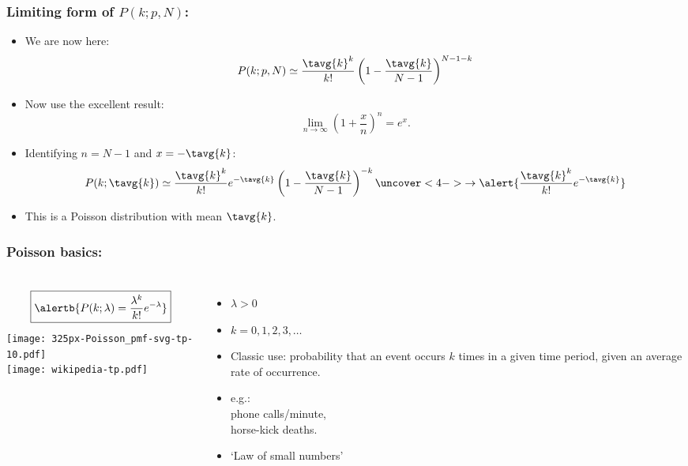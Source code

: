 \begin{frame}[label=]
  \frametitle{Limiting form of $P(k;p,N)$:}
  \small

  \begin{itemize}
  \item<1->
    We are now here:
    $$
    P(k;p,N)
    \simeq
    \frac{\tavg{k}^k}
    {k!}
    \left(
      1-\frac{\tavg{k}}{N-1}
    \right)^{N-1-k}
    $$
  \item<2->
    Now use the excellent result:
    $$
    \lim_{n \rightarrow \infty}
    \left(
      1+\frac{x}{n}
    \right)^n
    = e^{x}.
    $$
  \item<3->
    Identifying $n=N-1$ and $x=-\tavg{k}$:
    $$
    P(k;\tavg{k})
    \simeq
    \frac{\tavg{k}^k}
    {k!}
    e^{-\tavg{k}}
    \left(
      1-\frac{\tavg{k}}{N-1}
    \right)^{-k}
    \uncover<4->{
      \rightarrow
      \alert{
        \frac{\tavg{k}^k}
        {k!}
        e^{-\tavg{k}}
      }
    }
    $$
  \item<4->
    This is a 
    {Poisson distribution}
    with mean $\tavg{k}$.
  \end{itemize}

\end{frame}

\begin{frame}[label=]
  \frametitle{Poisson basics:}


  \begin{columns}
    $$
    \boxed{
      \alertb{
      P(k;\lambda)
      =
      \frac{\lambda^k}
      {k!}
      e^{-\lambda}}
  }
    $$
    \bigskip
    \texttt{[image: 325px-Poisson\_pmf-svg-tp-10.pdf]}\\
    \mbox{}\hfill\texttt{[image: wikipedia-tp.pdf]}
    \begin{itemize}
    \item 
      $\lambda > 0$
    \item 
      $k=0, 1, 2, 3, \ldots$
    \item 
      Classic use: probability
      that an event occurs $k$ 
      times in a given time period,
      given an average rate of occurrence.
    \item 
      e.g.:\\ 
      phone calls/minute,\\ 
      horse-kick deaths.
    \item 
      `Law of small numbers'
    \end{itemize}
  \end{columns}

\end{frame}


